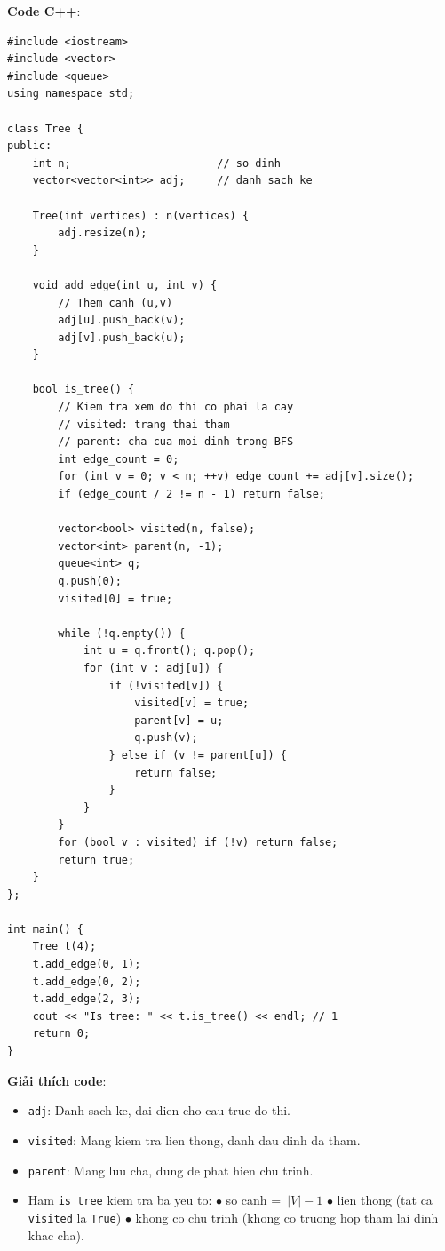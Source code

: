 \documentclass[a4paper,12pt]{article}
\begin{document}
\bigskip
\textbf{Code C++}:
\lstset{language=C++}
\begin{lstlisting}
#include <iostream>
#include <vector>
#include <queue>
using namespace std;

class Tree {
public:
    int n;                       // so dinh
    vector<vector<int>> adj;     // danh sach ke

    Tree(int vertices) : n(vertices) {
        adj.resize(n);
    }

    void add_edge(int u, int v) {
        // Them canh (u,v)
        adj[u].push_back(v);
        adj[v].push_back(u);
    }

    bool is_tree() {
        // Kiem tra xem do thi co phai la cay
        // visited: trang thai tham
        // parent: cha cua moi dinh trong BFS
        int edge_count = 0;
        for (int v = 0; v < n; ++v) edge_count += adj[v].size();
        if (edge_count / 2 != n - 1) return false;

        vector<bool> visited(n, false);
        vector<int> parent(n, -1);
        queue<int> q;
        q.push(0);
        visited[0] = true;

        while (!q.empty()) {
            int u = q.front(); q.pop();
            for (int v : adj[u]) {
                if (!visited[v]) {
                    visited[v] = true;
                    parent[v] = u;
                    q.push(v);
                } else if (v != parent[u]) {
                    return false;
                }
            }
        }
        for (bool v : visited) if (!v) return false;
        return true;
    }
};

int main() {
    Tree t(4);
    t.add_edge(0, 1);
    t.add_edge(0, 2);
    t.add_edge(2, 3);
    cout << "Is tree: " << t.is_tree() << endl; // 1
    return 0;
}
\end{lstlisting}

\bigskip
\textbf{Giải thích code}:
\begin{itemize}
    \item \texttt{adj}: Danh sach ke, dai dien cho cau truc do thi.
    \item \texttt{visited}: Mang kiem tra lien thong, danh dau dinh da tham.
    \item \texttt{parent}: Mang luu cha, dung de phat hien chu trinh.
    \item Ham \texttt{is\_tree} kiem tra ba yeu to:  
      \(\bullet\) so canh = \(\,|V|-1\)  
      \(\bullet\) lien thong (tat ca \texttt{visited} la \texttt{True})  
      \(\bullet\) khong co chu trinh (khong co truong hop tham lai dinh khac cha).
\end{itemize}
\end{document}
